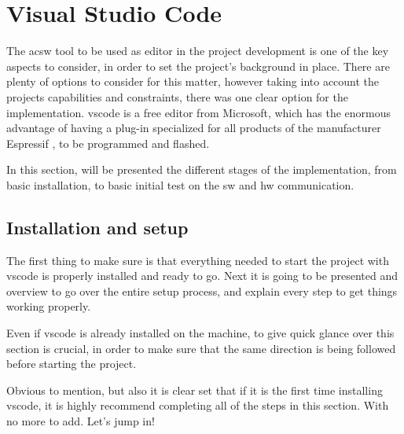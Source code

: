 %
%


\chapter{Visual Studio Code}

The ac{sw} tool to be used as editor in the project development is one of the key aspects to consider, in order to set the project's background in place. There are plenty of options to consider for this matter, however taking into account the projects capabilities and constraints, there was one clear option for the implementation. \ac{vscode} is a free editor from Microsoft, which has the enormous advantage of having a plug-in specialized for all products of the manufacturer Espressif \cite{Espressif:2022}, to be programmed and flashed.

In this section, will be presented the different stages of the implementation, from basic installation, to basic initial test on the \ac{sw} and \ac{hw} communication.


\section{Installation and setup}

The first thing to make sure is that everything needed to start the project with \ac{vscode} is properly installed and ready to go. Next it is going to be presented and overview to go over the entire setup process, and explain every step to get things working properly.

Even if \ac{vscode} is already installed on the machine, to give quick glance over this section is crucial, in order to make sure that the same direction is being followed before starting the project. 

Obvious to mention, but also it is clear set that if it is the first time installing \ac{vscode}, it is highly recommend completing all of the steps in this section. With no more to add. Let’s jump in!

